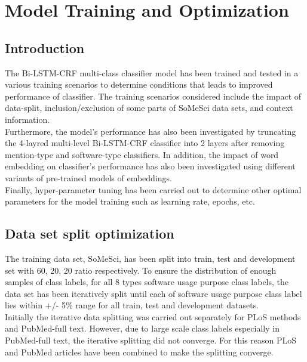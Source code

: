 \chapter{Model Training and Optimization }
\label{ch:chapter06}
 
%
%
\section{Introduction}
\label{sec:chapter06:intro}

The Bi-LSTM-CRF multi-class classifier model has been trained and tested in a various training scenarios to determine conditions that leads to improved performance of classifier. 
The training scenarios considered include the impact of data-split, inclusion/exclusion of some parts of SoMeSci data sets, and context information. \\ 

Furthermore, the model’s performance has also been investigated by truncating the 4-layred multi-level Bi-LSTM-CRF classifier into 2 layers after removing mention-type and software-type classifiers. 
In addition, the impact of word embedding on classifier’s performance  has also been investigated using different variants of pre-trained models of embeddings. \\

Finally, hyper-parameter tuning has been carried out to determine other optimal parameters for the model training such as  learning rate, epochs, etc.

\section{Data set split optimization}
\label{sec:chapter06:split}

The training data set, \ac{SoMeSci}, has been split into train, test and development set with  60, 20, 20 ratio respectively. To ensure the distribution  of enough samples of class labels, for all 8 types software usage purpose class labels, the data set has been iteratively split until each of software usage purpose class label lies within +/- 5\%  range for all train, test and development datasets. \\
 
Initially the iterative data splitting was carried out separately for PLoS methods and PubMed-full text. However, due to large scale class labels especially in PubMed-full text, the iterative splitting did not converge. For this reason PLoS and PubMed articles have been combined to make the splitting converge. \\

